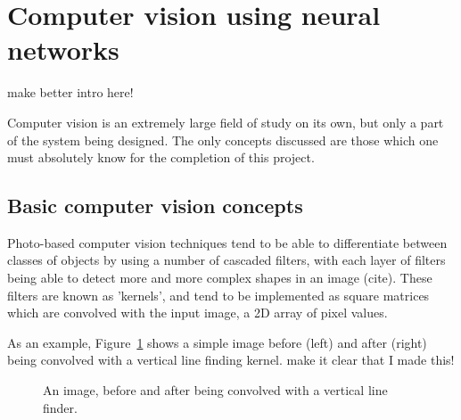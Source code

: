 \section{Computer vision using neural networks}

{\color{red} make better intro here!}

Computer vision is an extremely large field of study on its own, but only a part of the system being designed. The only concepts discussed are those which one must absolutely know for the completion of this project.

\subsection{Basic computer vision concepts}
Photo-based computer vision techniques tend to be able to differentiate between classes of objects by using a number of cascaded filters, with each layer of filters being able to detect more and more complex shapes in an image {\color{red} (cite)}. These filters are known as 'kernels', and tend to be implemented as square matrices which are convolved with the input image, a 2D array of pixel values.

As an example, Figure~\ref{fig:input_output_simple_filter} shows a simple image before (left) and after (right) being convolved with a vertical line finding kernel. {\color{red} make it clear that I made this!}

\begin{figure}[h!]%
    \centering
    \qquad \qquad
    \caption{An image, before and after being convolved with a vertical line finder.}%
    \label{fig:input_output_simple_filter}%
\end{figure}

